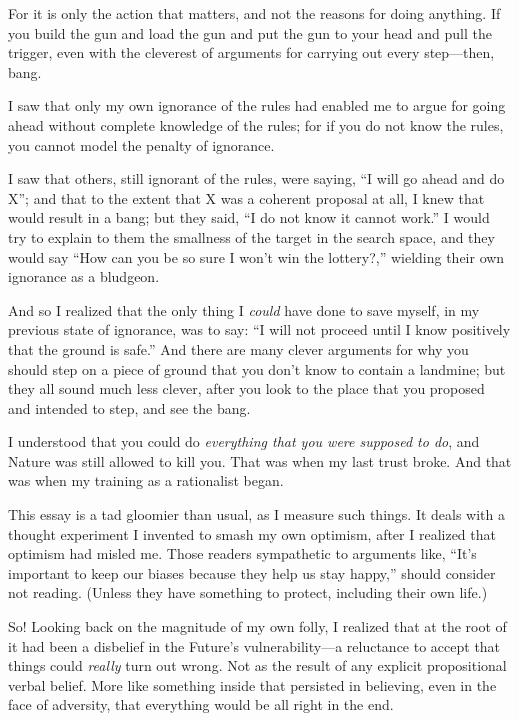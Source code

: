 {
 For it is only the action that matters, and not the reasons for
doing anything. If you build the gun and load the gun and put the gun
to your head and pull the trigger, even with the cleverest of arguments
for carrying out every step---then, bang.}

{
 I saw that only my own ignorance of the rules had enabled me to
argue for going ahead without complete knowledge of the rules; for if
you do not know the rules, you cannot model the penalty of ignorance.}

{
 I saw that others, still ignorant of the rules, were saying,
``I will go ahead and do X''; and
that to the extent that X was a coherent proposal at all, I knew that
would result in a bang; but they said, ``I do not know
it cannot work.'' I would try to explain to them the
smallness of the target in the search space, and they would say
``How can you be so sure I won't win
the lottery?,'' wielding their own ignorance as a
bludgeon.}

{
 And so I realized that the only thing I \textit{could} have done
to save myself, in my previous state of ignorance, was to say:
``I will not proceed until I know positively that the
ground is safe.'' And there are many clever arguments
for why you should step on a piece of ground that you
don't know to contain a landmine; but they all sound
much less clever, after you look to the place that you proposed and
intended to step, and see the bang.}

{
 I understood that you could do \textit{everything that you were
supposed to do}, and Nature was still allowed to kill you. That was
when my last trust broke. And that was when my training as a
rationalist began.}

\myendsectiontext


{
 This essay is a tad gloomier than usual, as I measure such things.
It deals with a thought experiment I invented to smash my own optimism,
after I realized that optimism had misled me. Those readers sympathetic
to arguments like, ``It's important to
keep our biases because they help us stay happy,''
should consider not reading. (Unless they have something to protect,
including their own life.) }

{
 So! Looking back on the magnitude of my own folly, I realized that
at the root of it had been a disbelief in the Future's
vulnerability---a reluctance to accept that things could
\textit{really} turn out wrong. Not as the result of any explicit
propositional verbal belief. More like something inside that persisted
in believing, even in the face of adversity, that everything would be
all right in the end.}

